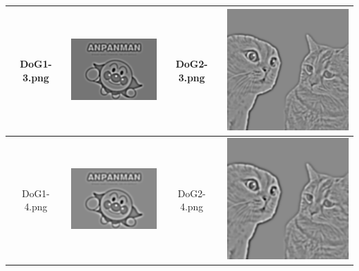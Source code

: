 \documentclass[a4paper, 12pt]{article}
\begin{document}
\begin{table}[!htb]
\begin{tabular}{|c|c|c|c|}
        \hline
        DoG1-3.png & \includegraphics[scale=1]{part1/result/DoG_1_3.png} & DoG2-3.png & \includegraphics[scale=0.6]{part1/result/DoG_2_3.png} \\
        \hline
        DoG1-4.png & \includegraphics[scale=1]{part1/result/DoG_1_4.png} & DoG2-4.png & \includegraphics[scale=0.6]{part1/result/DoG_2_4.png} \\
        \hline
    \end{tabular}
\end{table}
\end{document}
